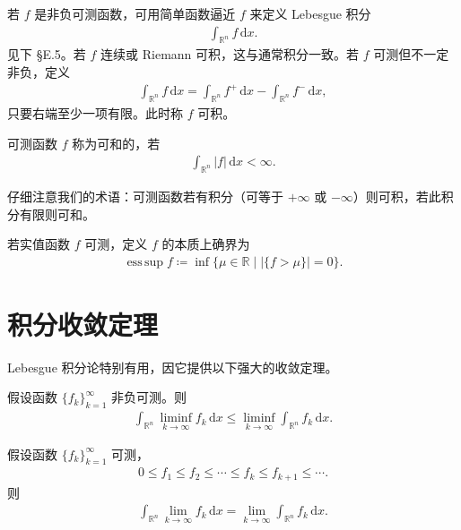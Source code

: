 \documentclass[../main.tex]{subfiles}
\begin{document}
若 $f$ 是非负可测函数，可用简单函数逼近 $f$ 来定义 Lebesgue 积分
\begin{align*}
\int_{\mathbb{R}^n}f\,\mathrm{d}x.
\end{align*}
见下 \S E.5。若 $f$ 连续或 Riemann 可积，这与通常积分一致。若 $f$ 可测但不一定非负，定义
\begin{align*}
\int_{\mathbb{R}^n}f\,\mathrm{d}x=\int_{\mathbb{R}^n}f^+\,\mathrm{d}x-\int_{\mathbb{R}^n}f^-\,\mathrm{d}x,
\end{align*}
只要右端至少一项有限。此时称 $f$ 可积。

\begin{definition}\label{definition:appE-可和}
可测函数 $f$ 称为可和的，若
\begin{align*}
\int_{\mathbb{R}^n}|f|\,\mathrm{d}x<\infty.
\end{align*}
\end{definition}

仔细注意我们的术语：可测函数若有积分（可等于 $+\infty$ 或 $-\infty$）则可积，若此积分有限则可和。

\begin{definition}\label{definition:appE-本质上确界}
若实值函数 $f$ 可测，定义 $f$ 的本质上确界为
\begin{align*}
\operatorname*{ess\,sup}f\coloneqq\inf\{\mu\in\mathbb{R}\mid|\{f>\mu\}|=0\}.
\end{align*}
\end{definition}

\section{积分收敛定理}\label{section:appE-积分收敛}

Lebesgue 积分论特别有用，因它提供以下强大的收敛定理。

\begin{theorem}[Fatou 引理。]\label{theorem:appE-Fatou}假设函数 $\{f_k\}_{k=1}^\infty$ 非负可测。则
\begin{align*}
\int_{\mathbb{R}^n}\liminf_{k\to\infty}f_k\,\mathrm{d}x\leqslant\liminf_{k\to\infty}\int_{\mathbb{R}^n}f_k\,\mathrm{d}x.
\end{align*}
\end{theorem}

\begin{theorem}[单调收敛定理。]\label{theorem:appE-单调收敛}假设函数 $\{f_k\}_{k=1}^\infty$ 可测，
\begin{align*}
0\leqslant f_1\leqslant f_2\leq\cdots\leqslant f_k\leqslant f_{k+1}\leqslant\cdots.
\end{align*}
则
\begin{align*}
\int_{\mathbb{R}^n}\lim_{k\to\infty}f_k\,\mathrm{d}x=\lim_{k\to\infty}\int_{\mathbb{R}^n}f_k\,\mathrm{d}x.
\end{align*}
\end{theorem}
\end{document}
